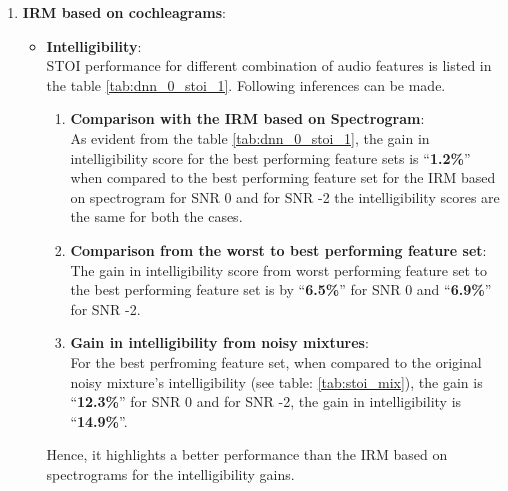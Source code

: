 \begin{enumerate}
\begin{itemize}
\end{itemize}
\item \textbf{IRM based on cochleagrams}:\\
\begin{itemize}
\item \textbf{Intelligibility}:\\
STOI performance for different combination of audio features is listed in the table \ref{tab:dnn_0_stoi_1}. Following inferences can be made.\\
\begin{enumerate}
\item \textbf{Comparison with the IRM based on Spectrogram}:\\
As evident from the table \ref{tab:dnn_0_stoi_1}, the gain in intelligibility score for the best performing feature sets is \enquote{\textbf{1.2\%}} when compared to the best performing feature set for the IRM based on spectrogram for SNR 0 and for SNR -2 the intelligibility scores are the same for both the cases.
\item \textbf{Comparison from the worst to best performing feature set}:\\
The gain in intelligibility score from worst performing feature set to the best performing feature set is by \enquote{\textbf{6.5\%}} for SNR 0 and \enquote{\textbf{6.9\%}} for SNR -2.\\ 
\item \textbf{Gain in intelligibility from noisy mixtures}:\\
For the best perfroming feature set, when compared to the original noisy mixture's intelligibility (see table: \ref{tab:stoi_mix}), the gain is \enquote{\textbf{12.3\%}} for SNR 0 and for SNR -2, the gain in intelligibility is \enquote{\textbf{14.9\%}}.\\ 
\end{enumerate}
Hence, it highlights a better performance than the IRM based on spectrograms for the intelligibility gains.


\end{itemize}
\end{enumerate}
